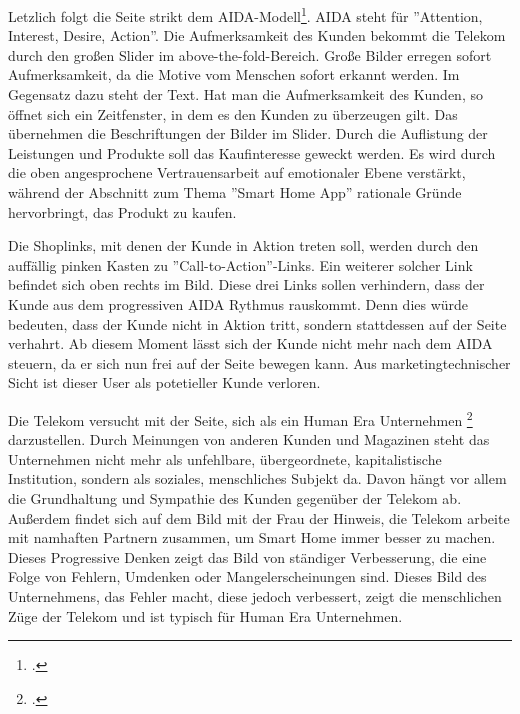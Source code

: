 Letzlich folgt die Seite strikt dem AIDA-Modell\footcite[vgl.][]{AIDA}. AIDA steht für ''Attention, Interest, Desire, Action''. Die Aufmerksamkeit des Kunden bekommt die Telekom durch den großen Slider im above-the-fold-Bereich. Große Bilder erregen sofort Aufmerksamkeit, da die Motive vom Menschen sofort erkannt werden. Im Gegensatz dazu steht der Text. Hat man die Aufmerksamkeit des Kunden, so öffnet sich ein Zeitfenster, in dem es den Kunden zu überzeugen gilt. Das übernehmen die Beschriftungen der Bilder im Slider. Durch die Auflistung der Leistungen und Produkte soll das Kaufinteresse geweckt werden. Es wird durch die oben angesprochene Vertrauensarbeit auf emotionaler Ebene verstärkt, während der Abschnitt zum Thema ''Smart Home App'' rationale Gründe hervorbringt, das Produkt zu kaufen.

Die Shoplinks, mit denen der Kunde in Aktion treten soll, werden durch den auffällig pinken Kasten zu ''Call-to-Action''-Links. Ein weiterer solcher Link befindet sich oben rechts im Bild. Diese drei Links sollen verhindern, dass der Kunde aus dem progressiven AIDA Rythmus rauskommt. Denn dies würde bedeuten, dass der Kunde nicht in Aktion tritt, sondern stattdessen auf der Seite verhahrt. Ab diesem Moment lässt sich der Kunde nicht mehr nach dem AIDA steuern, da er sich nun frei auf der Seite bewegen kann. Aus marketingtechnischer Sicht ist dieser User als potetieller Kunde verloren.

Die Telekom versucht mit der Seite, sich als ein Human Era Unternehmen \footcite[vgl.][]{humanEra} darzustellen. Durch Meinungen von anderen Kunden und Magazinen steht das Unternehmen nicht mehr als unfehlbare, übergeordnete, kapitalistische Institution, sondern als soziales, menschliches Subjekt da. Davon hängt vor allem die Grundhaltung und Sympathie des Kunden gegenüber der Telekom ab. Außerdem findet sich auf dem Bild mit der Frau der Hinweis, die Telekom arbeite mit namhaften Partnern zusammen, um Smart Home immer besser zu machen. Dieses Progressive Denken zeigt das Bild von ständiger Verbesserung, die eine Folge von Fehlern, Umdenken oder Mangelerscheinungen sind. Dieses Bild des Unternehmens, das Fehler macht, diese jedoch verbessert, zeigt die menschlichen Züge der Telekom und ist typisch für Human Era Unternehmen.

